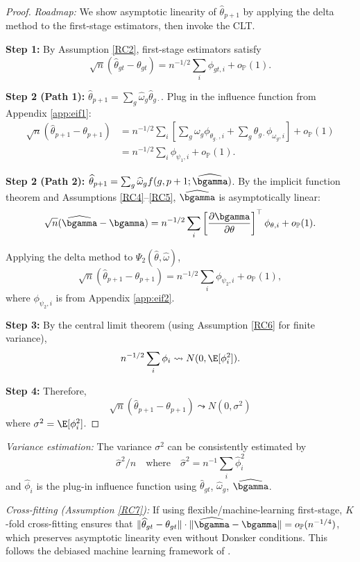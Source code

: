 \documentclass{article}
\renewcommand{\P}{\mathbb{P}}
\begin{document}
\begin{proof}
\textit{Roadmap:} We show asymptotic linearity of $\widehat{\theta}_{p+1}$ by applying the delta method to the first-stage estimators, then invoke the CLT.

\textbf{Step 1:} By Assumption \ref{RC2}, first-stage estimators satisfy
\[
\sqrt{n}(\widehat{\theta}_{gt} - \theta_{gt}) = n^{-1/2}\sum_i \phi_{gt,i} + o_{\P}(1).
\]

\textbf{Step 2 (Path 1):} $\widehat{\theta}_{p+1} = \sum_g \widehat{\omega}_g \widehat{\theta}_{g\cdot}$. Plug in the influence function from Appendix \ref{app:eif1}:
\begin{align*}
\sqrt{n}(\widehat{\theta}_{p+1} - \theta_{p+1}) &= n^{-1/2}\sum_i \left[\sum_g \omega_g \phi_{\theta_{g\cdot},i} + \sum_g \theta_{g\cdot} \phi_{\omega_g,i}\right] + o_{\P}(1) \\
&= n^{-1/2}\sum_i \phi_{\psi_1,i} + o_{\P}(1).
\end{align*}

\textbf{Step 2 (Path 2):} $\widehat{\theta}_{p+1} = \sum_g \widehat{\omega}_g f(g,p+1;\widehat{\bgamma})$. By the implicit function theorem and Assumptions \ref{RC4}--\ref{RC5}, $\widehat{\bgamma}$ is asymptotically linear:
\[
\sqrt{n}(\widehat{\bgamma} - \bgamma) = n^{-1/2}\sum_i \left[\frac{\partial \bgamma}{\partial \theta}\right]^\top \phi_{\theta,i} + o_{\P}(1).
\]

Applying the delta method to $\Psi_2(\widehat{\theta}, \widehat{\omega})$,
\[
\sqrt{n}(\widehat{\theta}_{p+1} - \theta_{p+1}) = n^{-1/2}\sum_i \phi_{\psi_2,i} + o_{\P}(1),
\]
where $\phi_{\psi_2,i}$ is from Appendix \ref{app:eif2}.

\textbf{Step 3:} By the central limit theorem (using Assumption \ref{RC6} for finite variance),
\[
n^{-1/2}\sum_i \phi_i \leadsto N(0, \E[\phi_i^2]).
\]

\textbf{Step 4:} Therefore,
\[
\sqrt{n}(\widehat{\theta}_{p+1} - \theta_{p+1}) \leadsto N(0, \sigma^2)
\]
where $\sigma^2 = \E[\phi_i^2]$.
\end{proof}

\begin{remark}
\textit{Variance estimation:} The variance $\sigma^2$ can be consistently estimated by
\[
\widehat{\sigma}^2/n \quad \text{where} \quad \widehat{\sigma}^2 = n^{-1}\sum_i \widehat{\phi}_i^2
\]
and $\widehat{\phi}_i$ is the plug-in influence function using $\widehat{\theta}_{gt}$, $\widehat{\omega}_g$, $\widehat{\bgamma}$.

\textit{Cross-fitting (Assumption \ref{RC7}):} If using flexible/machine-learning first-stage, $K$-fold cross-fitting ensures that $\|\widehat{\theta}_{gt} - \theta_{gt}\| \cdot \|\widehat{\bgamma} - \bgamma\| = o_{\P}(n^{-1/4})$, which preserves asymptotic linearity even without Donsker conditions. This follows the debiased machine learning framework of \citet{chernozhukovDoubleDebiasedMachine2018}.
\end{remark}
\end{document}
